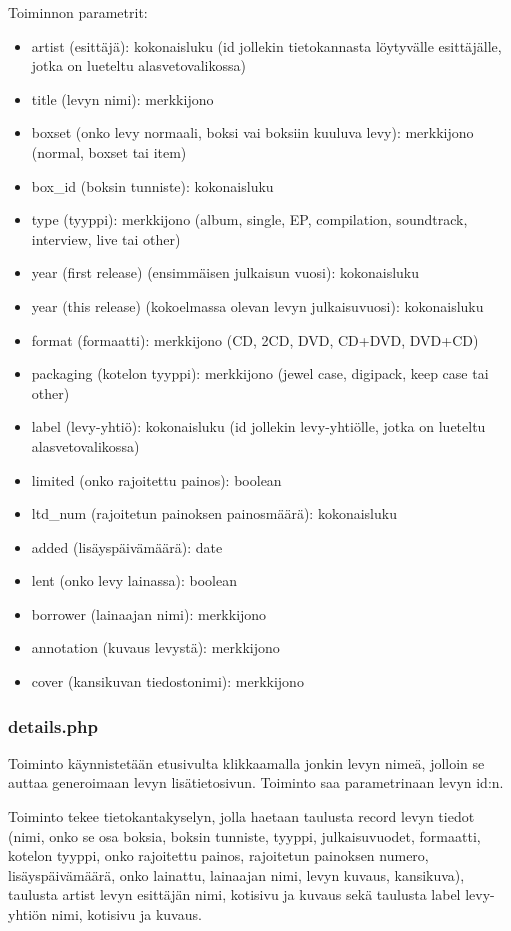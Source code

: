 \documentclass[a4paper,12pt]{report}
\begin{document}
Toiminnon parametrit:
\begin{itemize}
  \item artist (esittäjä): kokonaisluku (id jollekin tietokannasta
    löytyvälle esittäjälle, jotka on lueteltu alasvetovalikossa)
  \item title (levyn nimi): merkkijono
  \item boxset (onko levy normaali, boksi vai boksiin kuuluva levy):
    merkkijono (normal, boxset tai item)
  \item box\_id (boksin tunniste): kokonaisluku
  \item type (tyyppi): merkkijono (album, single, EP, compilation,
    soundtrack, interview, live tai other)
  \item year (first release) (ensimmäisen julkaisun vuosi): kokonaisluku
  \item year (this release) (kokoelmassa olevan levyn julkaisuvuosi):
    kokonaisluku
  \item format (formaatti): merkkijono (CD, 2CD, DVD, CD+DVD, DVD+CD)
  \item packaging (kotelon tyyppi): merkkijono (jewel case, digipack, keep
    case tai other)
  \item label (levy-yhtiö): kokonaisluku (id jollekin levy-yhtiölle, jotka
    on lueteltu alasvetovalikossa)
  \item limited (onko rajoitettu painos): boolean
  \item ltd\_num (rajoitetun painoksen painosmäärä): kokonaisluku
  \item added (lisäyspäivämäärä): date
  \item lent (onko levy lainassa): boolean
  \item borrower (lainaajan nimi): merkkijono
  \item annotation (kuvaus levystä): merkkijono
  \item cover (kansikuvan tiedostonimi): merkkijono
\end{itemize}

\subsubsection{details.php}

Toiminto käynnistetään etusivulta klikkaamalla jonkin levyn nimeä, jolloin
se auttaa generoimaan levyn lisätietosivun.  Toiminto saa parametrinaan
levyn id:n.

Toiminto tekee tietokantakyselyn, jolla haetaan taulusta record levyn tiedot
(nimi, onko se osa boksia, boksin tunniste, tyyppi, julkaisuvuodet,
formaatti, kotelon tyyppi, onko rajoitettu painos, rajoitetun painoksen
numero, lisäyspäivämäärä, onko lainattu, lainaajan nimi, levyn kuvaus,
kansikuva), taulusta artist levyn esittäjän nimi, kotisivu ja kuvaus sekä
taulusta label levy-yhtiön nimi, kotisivu ja kuvaus.
\end{document}
